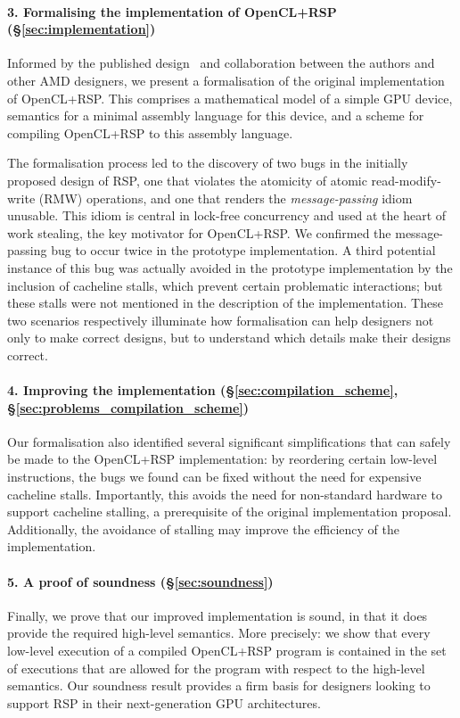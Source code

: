 \documentclass[svgnames,10pt]{sigplanconf}
\theoremstyle{definition}
\begin{document}
\paragraph{3. Formalising the implementation of OpenCL+RSP (\S\ref{sec:implementation})}
Informed by the published design~\cite{orr+15} and
collaboration between the authors and other AMD designers, we present a
formalisation of the original implementation of OpenCL+RSP. This
comprises a mathematical model of a simple GPU device, semantics for a
minimal assembly language for this device, and a scheme for compiling
OpenCL+RSP to this assembly language.

The formalisation process led to the discovery of two bugs in the initially
proposed design of RSP, one that violates the atomicity of atomic
read-modify-write (RMW) operations, and one that renders the
\emph{message-passing} idiom unusable. This idiom is central in
lock-free concurrency and used at the heart of work stealing, the key
motivator for OpenCL+RSP.
We confirmed the message-passing
bug to occur twice in the prototype implementation.
A third potential instance of this bug was actually avoided in the
prototype implementation by the inclusion of cacheline stalls, which
prevent certain problematic interactions; but these stalls were not
mentioned in the description of the implementation.
These two scenarios respectively illuminate how
formalisation can help designers not only to make correct designs, but
to understand which details make their designs correct.

\paragraph{4. Improving the implementation
(\S\ref{sec:compilation_scheme}, \S\ref{sec:problems_compilation_scheme})}
Our formalisation also identified several significant simplifications
that can safely be made to the OpenCL+RSP implementation: by
reordering certain low-level instructions, the bugs we found can
be fixed without the need for expensive cacheline stalls. Importantly,
this avoids the need for non-standard hardware to support cacheline
stalling, a prerequisite of the original implementation proposal.
Additionally, the avoidance of stalling may improve the efficiency of
the implementation.

\paragraph{5. A proof of soundness (\S\ref{sec:soundness})}
Finally, we prove that our improved implementation is sound, in that
it does provide the required high-level semantics. More
precisely: we show that every low-level execution of a compiled
OpenCL+RSP program is contained in the set of executions that are
allowed for the program with respect to the high-level semantics.
Our soundness result provides a firm basis for designers looking to
support RSP in their next-generation GPU architectures.
\end{document}

